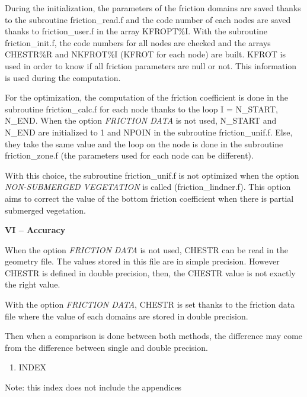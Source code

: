  \textbf{}

 During the initialization, the parameters of the friction domains are saved thanks to the subroutine friction\_read.f and the code number of each nodes are saved thanks to friction\_user.f in the array KFROPT\%I. With the subroutine friction\_init.f, the code numbers for all nodes are checked and the arrays CHESTR\%R and NKFROT\%I (KFROT for each node) are built. KFROT is used in order to know if all friction parameters are null or not. This information is used during the computation.

 \textbf{}

 For the optimization, the computation of the friction coefficient is done in the subroutine friction\_calc.f for each node thanks to the loop I = N\_START, N\_END. When the option \textit{FRICTION DATA} is not used, N\_START and N\_END are initialized to 1 and NPOIN in the subroutine friction\_unif.f. Else, they take the same value and the loop on the node is done in the subroutine friction\_zone.f  (the  parameters used for each node can be different).

 With this choice, the subroutine friction\_unif.f is not optimized when the option \textit{NON-SUBMERGED VEGETATION} is called (friction\_lindner.f). This option aims to correct the value of the bottom friction coefficient when there is partial submerged vegetation.

 \textbf{VI -- Accuracy}

 When the option \textit{FRICTION DATA} is not used, CHESTR can be read in the geometry file. The values stored in this file are in simple precision. However CHESTR is defined in double precision, then, the CHESTR value is not exactly the right value.

 With the option \textit{FRICTION DATA}, CHESTR is set thanks to the friction data file where the value of each domains are stored in double precision.

 Then when a comparison is done between both methods, the difference may come from the difference between single and double precision.



\begin{enumerate}
\item    INDEX
\end{enumerate}

 Note: this index does not include the appendices



